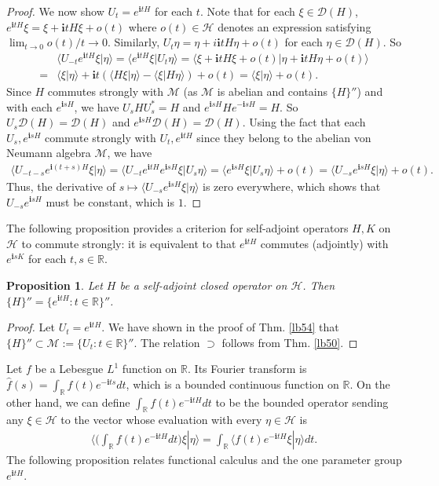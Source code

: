\documentclass[12pt,a4paper,notitlepage]{article}
\theoremstyle{definition}
\theoremstyle{plain}
\newtheorem{pp}[df]{Proposition}
\newcommand{\mc}{\mathcal}
\newcommand{\wht}{\widehat}
\newcommand{\Dom}{\scr D}
\newcommand{\bk}[1]{\langle {#1}\rangle}
\newcommand{\scr}{\mathscr}
\newcommand{\im}{\mathbf{i}}
\newcommand{\Rbb}{\mathbb R}
\numberwithin{equation}{section}
\begin{document}
\begin{proof}
We now show $U_t=e^{\im tH}$ for each $t$. Note that for each $\xi\in\Dom(H)$, $e^{\im tH}\xi=\xi+\im tH\xi+o(t)$ where $o(t)\in\mc H$ denotes an expression satisfying $\lim_{t\rightarrow 0}o(t)/t\rightarrow 0$. Similarly, $U_t\eta=\eta+i\im tH\eta+o(t)$ for each $\eta\in\Dom(H)$. So
\begin{align*}
&\bk{U_{-t}e^{\im tH}\xi|\eta}=\bk{e^{\im tH}\xi|U_t\eta}=\bk{\xi+\im tH\xi+o(t)|\eta+\im tH\eta+o(t)}\\
=&\bk{\xi|\eta}+\im t(\bk{H\xi|\eta}-\bk{\xi|H\eta})+o(t)=\bk{\xi|\eta}+o(t).	
\end{align*}
Since $H$ commutes strongly with $\mc M$ (as $\mc M$ is abelian and contains $\{H\}''$) and with each $e^{\im sH}$, we have $U_sHU_s^*=H$ and $e^{\im sH}H e^{-\im sH}=H$. So $U_s\Dom(H)=\Dom(H)$ and  $e^{\im sH}\Dom(H)=\Dom(H)$. Using the fact that each $U_s,e^{\im sH}$ commute strongly with $U_t,e^{\im t H}$ since they belong to the abelian von Neumann algebra $\mc M$, we have
\begin{align*}
\bk{U_{-t-s}e^{\im (t+s)H}\xi|\eta}=\bk{U_{-t}e^{\im tH}e^{\im sH}\xi|U_s\eta}=\bk{e^{\im sH}\xi|U_s\eta}+o(t)=\bk{U_{-s}e^{\im sH}\xi|\eta}+o(t).
\end{align*}
Thus, the derivative of $s\mapsto \bk{U_{-s}e^{\im sH}\xi|\eta}$ is zero everywhere, which shows that $U_{-s}e^{\im sH}$ must be constant, which is $1$.
\end{proof}


The following proposition provides a criterion for self-adjoint operators $H,K$ on $\mc H$ to commute strongly: it is equivalent to that $e^{\im tH}$ commutes (adjointly) with $e^{\im sK}$ for each $t,s\in\Rbb$.


\begin{pp}
Let $H$ be a self-adjoint closed operator on $\mc H$. Then $\{H\}''=\{e^{\im tH}:t\in\Rbb\}''$.
\end{pp}

\begin{proof}
Let $U_t=e^{\im tH}$. We have shown in the proof of Thm. \ref{lb54} that $\{H\}''\subset \mc M:=\{U_t:t\in\Rbb\}''$. The relation $\supset$ follows from Thm. \ref{lb50}.
\end{proof}



Let $f$ be a Lebesgue $L^1$ function on $\Rbb$. Its Fourier transform is $\wht f(s)=\int_\Rbb f(t)e^{-\im ts}dt$, which is a bounded continuous function on $\Rbb$. On the other hand, we can define $\int_\Rbb f(t)e^{-\im tH}dt$ to be the bounded operator sending any $\xi\in\mc H$ to the vector whose evaluation with every $\eta\in\mc H$ is
\begin{align*}
\Big\langle \big(\int_\Rbb f(t)e^{-\im tH}dt\big)\xi|\eta  \Big\rangle	=\int_\Rbb\big\langle f(t)e^{-\im tH}\xi|\eta\big\rangle dt.
\end{align*} 
The following proposition relates functional calculus and the one parameter group $e^{\im tH}$.
\end{document}
